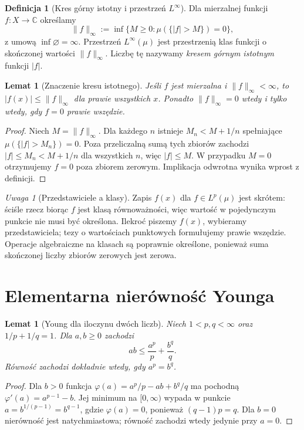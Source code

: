 \documentclass[11pt,a4paper,oneside]{book}
\numberwithin{equation}{chapter}
\theoremstyle{plain}
\newtheorem{lemat}[twierdzenie]{Lemat}
\theoremstyle{definition}
\newtheorem{definicja}[twierdzenie]{Definicja}
\theoremstyle{remark}
\newtheorem{uwaga}[twierdzenie]{Uwaga}
\begin{document}
\begin{definicja}[Kres górny istotny i przestrzeń $L^\infty$]
\label{def:linf-14}
Dla mierzalnej funkcji $f:X\to\mathbb C$ określamy
\[
\|f\|_\infty:=\inf\{M\ge0:\mu(\{|f|>M\})=0\},
\]
z umową $\inf\varnothing=\infty$.
Przestrzeń $L^\infty(\mu)$ jest przestrzenią klas
funkcji o skończonej wartości $\|f\|_\infty$.
Liczbę tę nazywamy \emph{kresem górnym istotnym} funkcji $|f|$.
\end{definicja}

\begin{lemat}[Znaczenie kresu istotnego]
\label{lem:esssup-14}
Jeśli $f$ jest mierzalna i $\|f\|_\infty<\infty$,
to $|f(x)|\le\|f\|_\infty$ dla prawie wszystkich $x$.
Ponadto $\|f\|_\infty=0$ wtedy i tylko wtedy, gdy
$f=0$ prawie wszędzie.
\end{lemat}
\begin{proof}
Niech $M=\|f\|_\infty$. Dla każdego $n$ istnieje
$M_n<M+1/n$ spełniające $\mu(\{|f|>M_n\})=0$.
Poza przeliczalną sumą tych zbiorów zachodzi
$|f|\le M_n<M+1/n$ dla wszystkich $n$, więc $|f|\le M$.
W przypadku $M=0$ otrzymujemy $f=0$ poza zbiorem zerowym.
Implikacja odwrotna wynika wprost z definicji.
\end{proof}

\begin{uwaga}[Przedstawiciele a klasy]
Zapis $f(x)$ dla $f\in L^p(\mu)$ jest skrótem:
ściśle rzecz biorąc $f$ jest klasą równoważności, więc
wartość w pojedynczym punkcie nie musi być określona.
Ilekroć piszemy $f(x)$, wybieramy przedstawiciela;
tezy o wartościach punktowych formułujemy prawie wszędzie.
Operacje algebraiczne na klasach są poprawnie określone,
ponieważ suma skończonej liczby zbiorów zerowych jest zerowa.
\end{uwaga}

\section{Elementarna nierówność Younga}

\begin{lemat}[Young dla iloczynu dwóch liczb]
\label{lem:young-numbers-14}
Niech $1<p,q<\infty$ oraz $1/p+1/q=1$.
Dla $a,b\ge0$ zachodzi
\begin{equation}\label{eq:young-14}
ab\le\frac{a^p}{p}+\frac{b^q}{q}.
\end{equation}
Równość zachodzi dokładnie wtedy, gdy $a^p=b^q$.
\end{lemat}
\begin{proof}
Dla $b>0$ funkcja $\varphi(a)=a^p/p-ab+b^q/q$
ma pochodną $\varphi'(a)=a^{p-1}-b$.
Jej minimum na $[0,\infty)$ wypada w punkcie
$a=b^{1/(p-1)}=b^{q-1}$, gdzie
$\varphi(a)=0$, ponieważ $(q-1)p=q$.
Dla $b=0$ nierówność jest natychmiastowa;
równość zachodzi wtedy jedynie przy $a=0$.
\end{proof}
\end{document}
